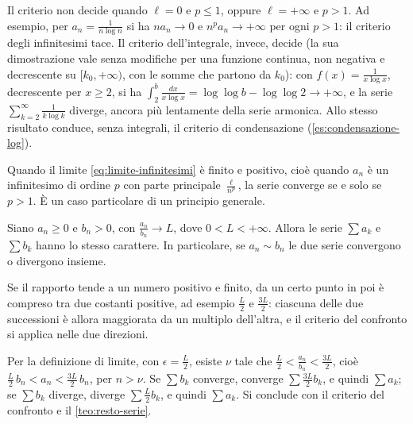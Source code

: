 Il criterio non decide quando $\ell=0$ e $p\le1$, oppure $\ell=+\infty$ e $p>1$. Ad esempio, per
$a_{n}=\frac1{n\log n}$ si ha $na_{n}\to0$ e $n^{p}a_{n}\to+\infty$ per ogni $p>1$: il criterio degli
infinitesimi tace. Il criterio dell'integrale, invece, decide (la sua dimostrazione vale
senza modifiche per una funzione continua, non negativa e decrescente su $[k_{0},+\infty)$, con
le somme che partono da $k_{0}$): con $f(x)=\frac1{x\log x}$, decrescente per $x\ge2$, si ha $\int_{2}^{b}\frac{dx}{x\log x}=\log\log b-\log\log2\to+\infty$, e la serie
$\sum_{k=2}^{\infty}\frac1{k\log k}$ diverge, ancora più lentamente della serie armonica. Allo stesso
risultato conduce, senza integrali, il criterio di condensazione
(\cref{es:condensazione-log}).

Quando il limite \eqref{eq:limite-infinitesimi} è finito e positivo, cioè quando $a_{n}$ è un
infinitesimo di ordine $p$ con parte principale $\frac\ell{n^{p}}$, la serie converge se e solo
se $p>1$. È un caso particolare di un principio generale.

\begin{corollario}\label{cor:confronto-asintotico}
Siano $a_{n}\ge0$ e $b_{n}>0$, con $\frac{a_{n}}{b_{n}}\to L$, dove $0<L<+\infty$. Allora le serie
$\sum a_{k}$ e $\sum b_{k}$ hanno lo stesso carattere. In particolare, se $a_{n}\sim b_{n}$ le due serie
convergono o divergono insieme.
\end{corollario}

\begin{schema}
\end{schema}

\begin{strategia}
Se il rapporto tende a un numero positivo e finito, da un certo punto in poi è compreso
tra due costanti positive, ad esempio $\frac L2$ e $\frac{3L}2$: ciascuna delle due successioni è
allora maggiorata da un multiplo dell'altra, e il criterio del confronto si applica
nelle due direzioni.
\end{strategia}

\begin{dimostrazione}
Per la definizione di limite, con $\epsilon=\frac L2$, esiste $\nu$ tale che
$\frac L2<\frac{a_{n}}{b_{n}}<\frac{3L}2$, cioè $\frac L2\,b_{n}<a_{n}<\frac{3L}2\,b_{n}$, per $n>\nu$. Se $\sum b_{k}$
converge, converge $\sum\frac{3L}2b_{k}$, e quindi $\sum a_{k}$; se $\sum b_{k}$ diverge, diverge
$\sum\frac L2b_{k}$, e quindi $\sum a_{k}$. Si conclude con il criterio del confronto e il
\cref{teo:resto-serie}.
\end{dimostrazione}

